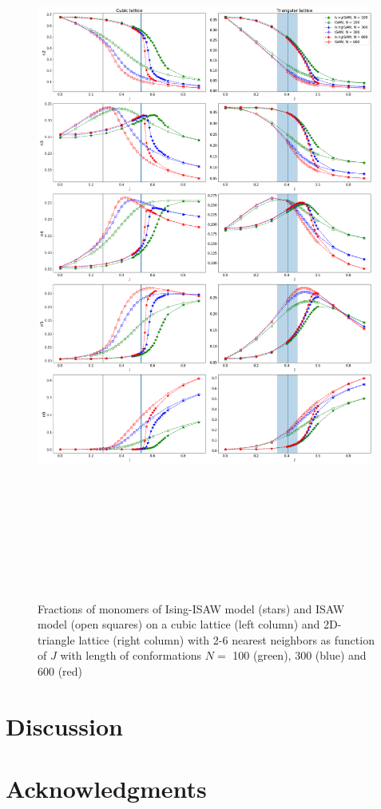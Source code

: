 \documentclass[aps,pre,amssymb,amsmath,twocolumn,floatfix]{revtex4-2}
\begin{document}
\begin{figure}
    \centering
    \includegraphics[width=0.99\textwidth, height=24cm]{Images/Ising_vs_ISAW.png}
    \caption{Fractions of monomers of Ising-ISAW model (stars) and ISAW model (open squares) on a cubic lattice (left column) and 2D-triangle lattice (right column) with 2-6 nearest neighbors as function of $J$ with length of conformations $N = $ 100 (green), 300 (blue) and 600 (red)}
    \label{fig:Ising_vs_ISAW}
\end{figure}


\section{Discussion}

\section{Acknowledgments}

\newpage


\end{document}
